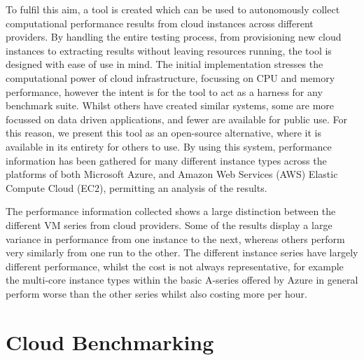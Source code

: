 \documentclass{entcs} \usepackage{entcsmacro}
\begin{document}
To fulfil this aim, a tool is created which can be used to autonomously collect computational performance results from cloud instances across different providers. By handling the entire testing process, from provisioning new cloud instances to extracting results without leaving resources running, the tool is designed with ease of use in mind. The initial implementation stresses the computational power of cloud infrastructure, focussing on CPU and memory performance, however the intent is for the tool to act as a harness for any benchmark suite. Whilst others have created similar systems, some are more focussed on data driven applications, and fewer are available for public use. For this reason, we present this tool as an open-source alternative, where it is available in its entirety for others to use. By using this system, performance information has been gathered for many different instance types across the platforms of both Microsoft Azure, and Amazon Web Services (AWS) Elastic Compute Cloud (EC2), permitting an analysis of the results.

The performance information collected shows a large distinction between the different VM series from cloud providers. Some of the results display a large variance in performance from one instance to the next, whereas others perform very similarly from one run to the other. The different instance series have largely different performance, whilst the cost is not always representative, for example the multi-core instance types within the basic A-series offered by Azure in general perform worse than the other series whilst also costing more per hour.


\section{Cloud Benchmarking}\label{sec:bench}

\end{document}
